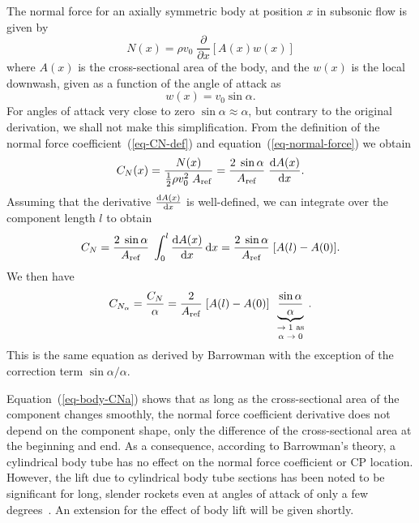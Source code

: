 The normal force for an axially symmetric body at position $x$ in
subsonic flow is given by
%
\begin{equation}
N(x) = \rho v_0 \; \frac{\partial}{\partial x}[A(x)w(x)]
\label{eq-normal-force}
\end{equation}
%
where $A(x)$ is the cross-sectional area of the body, and the $w(x)$
is the local downwash, given as a function of the angle of attack as
%
\begin{equation}
w(x) = v_0 \sin\alpha.
\end{equation}
%
For angles of attack very close to zero $\sin\alpha\approx\alpha$, but
contrary to the original derivation, we shall not make this
simplification.  From the definition of the normal force
coefficient~(\ref{eq-CN-def}) and equation~(\ref{eq-normal-force}) we
obtain
%
\begin{equation}
C_N(x) = \frac{N(x)}{\frac{1}{2}\rho v_0^2\;\Aref}
       = \frac{2\; \sin\alpha}{\Aref}\; \frac{\dif A(x)}{\dif x}.
\label{eq-CNx}
\end{equation}
%
Assuming that the derivative $\frac{\dif A(x)}{\dif x}$ is
well-defined, we can integrate over the component length $l$ to obtain
%
\begin{equation}
C_N = \frac{2\; \sin\alpha}{\Aref}\;
      \int_0^l \frac{\dif A(x)}{\dif x}\dif x
    = \frac{2\; \sin\alpha}{\Aref}\; [A(l)-A(0)].
\end{equation}
%
We then have
%
\begin{equation}
\CNa = \frac{C_N}{\alpha}
     = \frac{2}{\Aref}\; [A(l)-A(0)]\;
       \underbrace{\frac{\sin\alpha}{\alpha}}_
  {\parbox{10mm}{\scriptsize\centering
  $\rightarrow 1$ as \\ $\alpha\rightarrow0$}}.
\label{eq-body-CNa}
\end{equation}
%
This is the same equation as derived by Barrowman with the exception
of the correction term $\sin\alpha/\alpha$.

Equation~(\ref{eq-body-CNa}) shows that as long as the cross-sectional
area of the component changes smoothly, the normal force coefficient
derivative does not depend on the component shape, only the difference
of the cross-sectional area at the beginning and end.  As a
consequence, according to Barrowman's theory, a cylindrical body tube
has no effect on the normal force coefficient or CP location.
However, the lift due to cylindrical body tube sections has been noted
to be significant for long, slender rockets even at angles of attack
of only a few degrees~\cite{galejs}.  An extension
for the effect of body lift will be given shortly.




